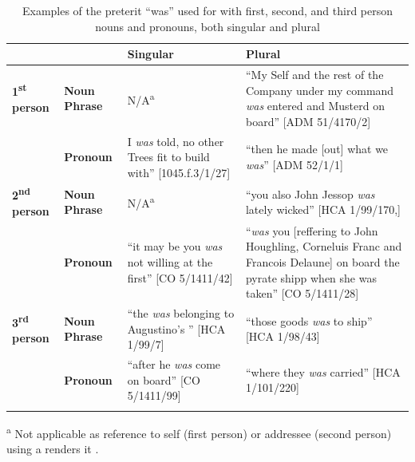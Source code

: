 \begin{table}
\caption{\label{tab:key:6.1} Examples of the preterit “was” used for with first, second, and third person nouns and pronouns, both singular and plural}

\begin{tabularx}{\textwidth}{llQQ} 
\lsptoprule
&  & \textbf{Singular} & \textbf{Plural}\\
\midrule
 \textbf{1\textsuperscript{st}} \textbf{person} & \textbf{Noun} \textbf{Phrase} & N/A\textsuperscript{a} & “My Self and the rest of the Company under my command \textit{was} entered and Musterd on board” [ADM 51/4170/2]\\
& \textbf{Pronoun} & I \textit{was} told, no other Trees fit to build with” [1045.f.3/1/27] & “then he made [out] what we \textit{was}” [ADM 52/1/1]\\

\tablevspace
 \textbf{2\textsuperscript{nd}} \textbf{person} & \textbf{Noun} \textbf{Phrase} & N/A\textsuperscript{a} & “you also John Jessop \textit{was} lately wicked” [HCA 1/99/170,]\\
& \textbf{Pronoun} & “it may be you \textit{was} not willing at the first” [CO 5/1411/42] & “\textit{was} you [reffering to John Houghling, Corneluis Franc and Francois Delaune] on board the pyrate shipp when she was taken” [CO 5/1411/28] \\

\tablevspace
 \textbf{3\textsuperscript{rd}} \textbf{person} & \textbf{Noun} \textbf{Phrase} & “the  \textit{was} belonging to Augustino’s ” [HCA 1/99/7] & “those goods \textit{was} to ship” [HCA 1/98/43] \\
& \textbf{Pronoun} & “after he \textit{was} come on board” [CO 5/1411/99] & “where they \textit{was} carried” [HCA 1/101/220]\\

\lspbottomrule
\end{tabularx}\end{table}
\textsuperscript{a} Not applicable as reference to self (first person) or addressee (second person) using a  renders it . 

